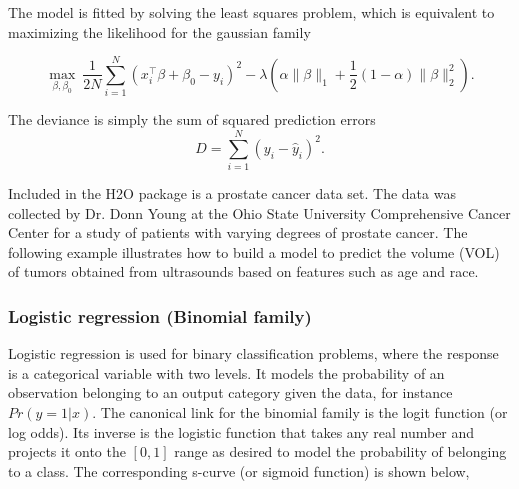 The model is fitted by solving the least squares problem, which is equivalent to maximizing the likelihood for the gaussian family

$$ \max_{\beta,\beta_0} \ \frac{1}{2N} \sum_{i=1}^N  (x_i^{\top}\beta + \beta_0 - y_i)^2  - \lambda \left(  \alpha \|\beta \|_1 +  \frac{1}{2} (1- \alpha) \| \beta \|_2^2 \right).$$

The deviance is simply the sum of squared prediction errors
$$ D = \sum_{i=1}^{N} (y_i - \hat{y}_i)^2 . $$

\waterExampleInR

Included in the H2O package is a prostate cancer data set. The data was collected by Dr. Donn Young at the Ohio State
University Comprehensive Cancer Center for a study of patients with varying degrees of prostate cancer. The
following example illustrates how to build a model to predict the volume (VOL) of tumors obtained from ultrasounds
based on features such as age and race.
\bigskip


\waterExampleInPython


\subsubsection{Logistic regression (Binomial family)}
Logistic regression is used for binary classification problems, where the response is a categorical variable with two
levels. It models the probability of an observation belonging to an output category given the data, for instance $ Pr(y = 1|x)$.
The canonical link for the binomial family is the logit function (or log odds). Its inverse is the logistic function that takes any real number and projects it onto the $[0,1]$ range as desired to model the probability of belonging to a class. The corresponding s-curve (or sigmoid function) is shown below,

